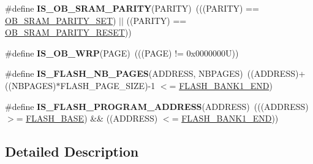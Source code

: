 \begin{DoxyCompactItemize}
\item 
\mbox{\label{group___f_l_a_s_h_ex___private___macros_gaadd4427f42c653a148c2ce8035c25ab0}} 
\#define {\bfseries I\+S\+\_\+\+O\+B\+\_\+\+S\+R\+A\+M\+\_\+\+P\+A\+R\+I\+TY}(P\+A\+R\+I\+TY)~(((P\+A\+R\+I\+TY) == \hyperlink{group___f_l_a_s_h_ex___o_b___r_a_m___parity___check___enable_gab108dcd65836f802216f11c238450cd6}{O\+B\+\_\+\+S\+R\+A\+M\+\_\+\+P\+A\+R\+I\+T\+Y\+\_\+\+S\+ET}) $\vert$$\vert$ ((P\+A\+R\+I\+TY) == \hyperlink{group___f_l_a_s_h_ex___o_b___r_a_m___parity___check___enable_gab408447c5e7a9bd087e9346cc3b3021b}{O\+B\+\_\+\+S\+R\+A\+M\+\_\+\+P\+A\+R\+I\+T\+Y\+\_\+\+R\+E\+S\+ET}))
\item 
\mbox{\label{group___f_l_a_s_h_ex___private___macros_ga0833946dba77c6e2537b4afe94c2bfe1}} 
\#define {\bfseries I\+S\+\_\+\+O\+B\+\_\+\+W\+RP}(P\+A\+GE)~(((P\+A\+GE) != 0x0000000\+U))
\item 
\mbox{\label{group___f_l_a_s_h_ex___private___macros_gaba549bf655e360311b0cd69878ba5bc1}} 
\#define {\bfseries I\+S\+\_\+\+F\+L\+A\+S\+H\+\_\+\+N\+B\+\_\+\+P\+A\+G\+ES}(A\+D\+D\+R\+E\+SS,  N\+B\+P\+A\+G\+ES)~((A\+D\+D\+R\+E\+SS)+((N\+B\+P\+A\+G\+ES)$\ast$F\+L\+A\+S\+H\+\_\+\+P\+A\+G\+E\+\_\+\+S\+I\+ZE)-\/1 $<$= \hyperlink{group___peripheral__memory__map_ga443a2786535d83e32dfdc2b29e379332}{F\+L\+A\+S\+H\+\_\+\+B\+A\+N\+K1\+\_\+\+E\+ND})
\item 
\mbox{\label{group___f_l_a_s_h_ex___private___macros_ga90c8441d56b937cea616856695a8a20a}} 
\#define {\bfseries I\+S\+\_\+\+F\+L\+A\+S\+H\+\_\+\+P\+R\+O\+G\+R\+A\+M\+\_\+\+A\+D\+D\+R\+E\+SS}(A\+D\+D\+R\+E\+SS)~(((A\+D\+D\+R\+E\+SS) $>$= \hyperlink{group___peripheral__memory__map_ga23a9099a5f8fc9c6e253c0eecb2be8db}{F\+L\+A\+S\+H\+\_\+\+B\+A\+SE}) \&\& ((A\+D\+D\+R\+E\+SS) $<$= \hyperlink{group___peripheral__memory__map_ga443a2786535d83e32dfdc2b29e379332}{F\+L\+A\+S\+H\+\_\+\+B\+A\+N\+K1\+\_\+\+E\+ND}))
\end{DoxyCompactItemize}


\subsection{Detailed Description}


